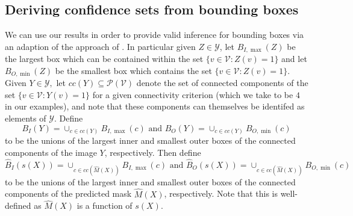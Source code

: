 \subsection{Deriving confidence sets from bounding boxes}\label{AA:BBtheory}
We can use our results in order to provide valid inference for bounding boxes via an adaption of the approach of \cite{Andeol2023}. In particular given $Z \in \mathcal{Y}$, let $B_{I, \max}(Z)$ be the largest box which can be contained within the set $\lbrace v\in \mathcal{V}: Z(v) = 1 \rbrace$ and let $ B_{O, \min}(Z)$ be the smallest box which contains the set $\lbrace v\in \mathcal{V}: Z(v) = 1 \rbrace$. Given $Y \in \mathcal{Y}, $ let $cc(Y) \subseteq \mathcal{P}(\mathcal{V})$ denote the set of connected components of the set $\lbrace v\in \mathcal{V}: Y(v) = 1 \rbrace$ for a given connectivity criterion (which we take to be $4$ in our examples), and note that these components can themselves be identifed as elements of $\mathcal{Y}$. Define 
$$B_I(Y) = \cup_{c \in cc(Y)} B_{I, \max}(c) \text{ and } B_O(Y) = \cup_{c \in cc(Y)} B_{O, \min}(c)$$
to be the unions of the largest inner and smallest outer boxes of the connected components of the image $Y$, respectively. Then define
$$\hat{B}_I(s(X)) = \cup_{c \in cc(\hat{M}(X)) } B_{I, \max}(c) \text{ and } \hat{B}_O(s(X)) = \cup_{c \in cc(\hat{M}(X))} B_{O, \min}(c)$$
to be the unions of the largest inner and smallest outer boxes of the connected components of the predicted mask $\hat{M}(X)$, respectively. Note that this is well-defined as $\hat{M}(X)$ is a function of $s(X)$.


